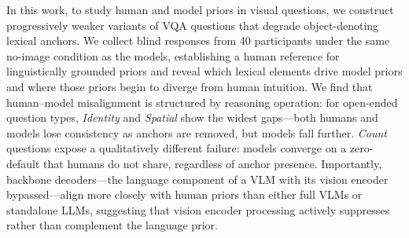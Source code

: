 \documentclass[letterpaper]{article}
\begin{document}
In this work, to study human and model priors in visual questions, we construct progressively weaker variants of VQA questions that degrade object-denoting lexical
anchors. We collect blind responses from 40 participants under the same no-image condition as the models, establishing a human reference for linguistically grounded priors and reveal which lexical elements drive model priors and where those priors begin to diverge from human intuition. 
We find that human--model misalignment is structured by reasoning operation:
for open-ended question types, \textit{Identity} and \textit{Spatial} show the widest gaps---both humans and models lose consistency as anchors are removed, but models fall further.
\textit{Count} questions expose a qualitatively different failure: models converge on a
zero-default that humans do not share, regardless of anchor presence.
Importantly, backbone decoders---the language component of a VLM with its vision
encoder bypassed---align more closely with human priors than either full VLMs or
standalone LLMs, suggesting that vision encoder processing actively suppresses rather than
complement the language prior.
\end{document}
